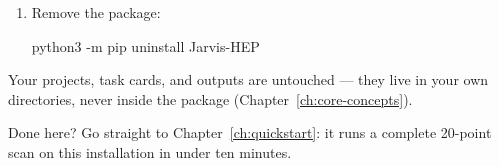 \begin{enumerate}
  \item Remove the package:
\begin{terminal}
\begin{jcmd}
python3 -m pip uninstall Jarvis-HEP
\end{jcmd}
\end{terminal}
\end{enumerate}

Your projects, task cards, and outputs are untouched --- they live in your own
directories, never inside the package (Chapter~\ref{ch:core-concepts}).

\begin{jtip}
Done here? Go straight to Chapter~\ref{ch:quickstart}: it runs a complete 20-point
scan on this installation in under ten minutes.
\end{jtip}
